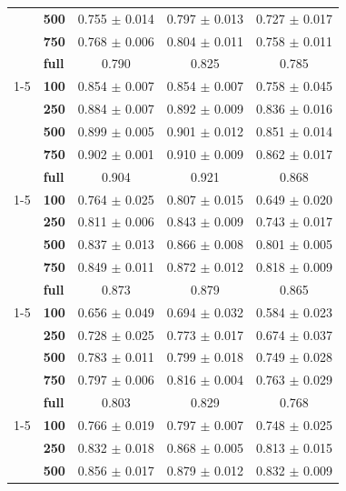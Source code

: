 \begin{table}[t]
\begin{tabular}{llccc}
\textbf{} & \textbf{500} & 0.755 $\pm$ 0.014 & 0.797 $\pm$ 0.013 & 0.727 $\pm$ 0.017 \\
\textbf{} & \textbf{750} & 0.768 $\pm$ 0.006 & 0.804 $\pm$ 0.011 & 0.758 $\pm$ 0.011 \\
\textbf{} & \textbf{full} & 0.790 & 0.825 & 0.785 \\
\cline{1-5}
\multirow[t]{5}{*}{\textbf{Amharic}} & \textbf{100} & 0.854 $\pm$ 0.007 & 0.854 $\pm$ 0.007 & 0.758 $\pm$ 0.045 \\
\textbf{} & \textbf{250} & 0.884 $\pm$ 0.007 & 0.892 $\pm$ 0.009 & 0.836 $\pm$ 0.016 \\
\textbf{} & \textbf{500} & 0.899 $\pm$ 0.005 & 0.901 $\pm$ 0.012 & 0.851 $\pm$ 0.014 \\
\textbf{} & \textbf{750} & 0.902 $\pm$ 0.001 & 0.910 $\pm$ 0.009 & 0.862 $\pm$ 0.017 \\
\textbf{} & \textbf{full} & 0.904 & 0.921 & 0.868 \\
\cline{1-5}
\multirow[t]{5}{*}{\textbf{Hausa}} & \textbf{100} & 0.764 $\pm$ 0.025 & 0.807 $\pm$ 0.015 & 0.649 $\pm$ 0.020 \\
\textbf{} & \textbf{250} & 0.811 $\pm$ 0.006 & 0.843 $\pm$ 0.009 & 0.743 $\pm$ 0.017 \\
\textbf{} & \textbf{500} & 0.837 $\pm$ 0.013 & 0.866 $\pm$ 0.008 & 0.801 $\pm$ 0.005 \\
\textbf{} & \textbf{750} & 0.849 $\pm$ 0.011 & 0.872 $\pm$ 0.012 & 0.818 $\pm$ 0.009 \\
\textbf{} & \textbf{full} & 0.873 & 0.879 & 0.865 \\
\cline{1-5}
\multirow[t]{5}{*}{\textbf{Igbo}} & \textbf{100} & 0.656 $\pm$ 0.049 & 0.694 $\pm$ 0.032 & 0.584 $\pm$ 0.023 \\
\textbf{} & \textbf{250} & 0.728 $\pm$ 0.025 & 0.773 $\pm$ 0.017 & 0.674 $\pm$ 0.037 \\
\textbf{} & \textbf{500} & 0.783 $\pm$ 0.011 & 0.799 $\pm$ 0.018 & 0.749 $\pm$ 0.028 \\
\textbf{} & \textbf{750} & 0.797 $\pm$ 0.006 & 0.816 $\pm$ 0.004 & 0.763 $\pm$ 0.029 \\
\textbf{} & \textbf{full} & 0.803 & 0.829 & 0.768 \\
\cline{1-5}
\multirow[t]{5}{*}{\textbf{Yoruba}} & \textbf{100} & 0.766 $\pm$ 0.019 & 0.797 $\pm$ 0.007 & 0.748 $\pm$ 0.025 \\
\textbf{} & \textbf{250} & 0.832 $\pm$ 0.018 & 0.868 $\pm$ 0.005 & 0.813 $\pm$ 0.015 \\
\textbf{} & \textbf{500} & 0.856 $\pm$ 0.017 & 0.879 $\pm$ 0.012 & 0.832 $\pm$ 0.009 \\

\end{tabular}
\end{table}
